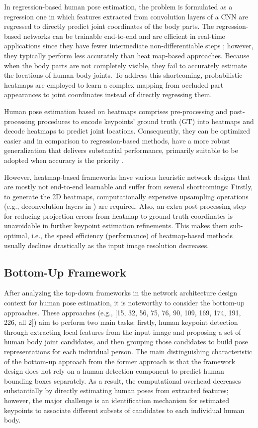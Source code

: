 In regression-based human pose estimation, the problem is formulated as a regression one in which features extracted from convolution layers of a CNN are regressed to directly predict joint coordinates of the body parts. The regression-based networks can be trainable end-to-end and are efficient in real-time applications since they have fewer intermediate non-differentiable steps \cite{liu_cascaded_2018, eichner_human_2012, felzenszwalb_pictorial_2005, girdhar_detect-and-track_2018}; however, they typically perform less accurately than heat map-based approaches. Because when the body parts are not completely visible, they fail to accurately estimate the locations of human body joints. To address this shortcoming, probabilistic heatmaps are employed to learn a complex mapping from occluded part appearances to joint coordinates instead of directly regressing them. 

Human pose estimation based on heatmaps comprises pre-processing and post-processing procedures to encode keypoints' ground truth (GT) into heatmaps and decode heatmaps to predict joint locations. Consequently, they can be optimized easier and in comparison to regression-based methods, have a more robust generalization that delivers substantial performance, primarily suitable to be adopted when accuracy is the priority \cite{pfister_flowing_2015}. 

However, heatmap-based frameworks have various heuristic network designs that are mostly not end-to-end learnable and suffer from several shortcomings: Firstly, to generate the 2D heatmaps, computationally expensive upsampling operations (e.g., deconvolution layers in \cite{yixing_gao_user_2015}) are required. Also, an extra post-processing step for reducing projection errors from heatmap to ground truth coordinates is unavoidable in further keypoint estimation refinements. This makes them sub-optimal, i.e., the speed efficiency (performance) of heatmap-based methods usually declines drastically as the input image resolution decreases. 

\subsection{Bottom-Up Framework}
 
After analyzing the top-down frameworks in the network architecture design context for human pose estimation, it is noteworthy to consider the bottom-up approaches. These approaches (e.g., [15, 32, 56, 75, 76, 90, 109, 169, 174, 191, 226, all 2]) aim to perform two main tasks: firstly, human keypoint detection through extracting local features from the input image and proposing a set of human body joint candidates, and then grouping those candidates to build pose representations for each individual person. The main distinguishing characteristic of the bottom-up approach from the former approach is that the framework design does not rely on a human detection component to predict human bounding boxes separately. As a result, the computational overhead decreases substantially by directly estimating human poses from extracted features; however, the major challenge is an identification mechanism for estimated keypoints to associate different subsets of candidates to each individual human body. 